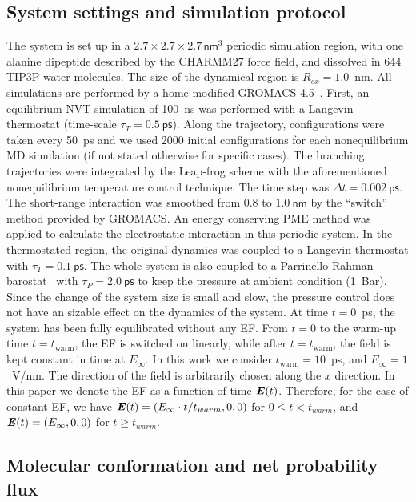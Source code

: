 \documentclass[a4paper,preprint,unsortedaddress,onecolumn]{revtex4-1}
\newcommand{\vect}[1]{\textbf{\textit{#1}}}
\begin{document}
\subsection{System settings and simulation protocol}
The system is set up in a $2.7\times 2.7\times
2.7\, \textsf{nm}^3$ periodic simulation region, with one alanine dipeptide
described by the CHARMM27 force field, and dissolved in 644 TIP3P
water molecules.
The size of the  dynamical region is $R_{ex} = 1.0$~nm.
All simulations are performed by a home-modified GROMACS 4.5~\cite{pronk2013gromacs}.
First, an equilibrium NVT simulation of
100~\textsf{ns} was performed with a Langevin thermostat (time-scale
$\tau_T = 0.5~\textsf{ps}$).  Along the trajectory, configurations were taken every
50~\textsf{ps} and we used 2000 initial configurations for each nonequilibrium
MD simulation (if not stated otherwise for specific cases).
The branching trajectories were integrated by the
Leap-frog scheme with the aforementioned nonequilibrium
temperature control technique.  The
time step was $\Delta t = 0.002~\textsf{ps}$. The short-range
interaction was smoothed from $0.8$ to $1.0~\textsf{nm}$ by the
``switch'' method provided by GROMACS.  An energy conserving PME
method was applied to calculate the electrostatic interaction in this
periodic system. In the thermostated region, the original dynamics was
coupled to a Langevin thermostat with $\tau_T = 0.1~\textsf{ps}$.
The whole system is also coupled to a Parrinello-Rahman barostat~\cite{parrinello1981polymorphic} with $\tau_P = 2.0~\textsf{ps}$ to keep
the pressure at ambient condition (1~Bar). Since the
change of the system size is small and slow, the pressure control
does not have an sizable effect on the
dynamics of the system.
At time $t=0$~ps, the system
has been fully equilibrated without any EF. From $t=0$ to
the warm-up time $t=t_{\textrm{warm}}$, the EF is switched on linearly, while
after $t=t_{\textrm{warm}}$, the field is kept constant in time at
$E_{\infty}$.  In this work we consider $t_{\textrm{warm}} = 10$~ps,
and $E_{\infty} = 1$~V/nm.
The direction of the field is arbitrarily chosen along the
$x$ direction.
In this paper we denote the
EF as a function of time $\vect E(t)$.
Therefore, for the case of constant EF, we have
$\vect E(t) = (E_\infty\cdot t/t_{warm},0,0)$ for $0\leq t < t_{warm}$, and 
$\vect E(t) = (E_\infty,0,0)$
for $t \geq t_{warm}$.


\subsection{Molecular conformation and net probability flux}
\end{document}
